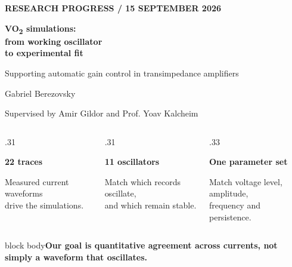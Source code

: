 \documentclass[aspectratio=169,11pt]{beamer}
\newcommand{\eyebrow}[1]{{\color{teal}\scriptsize\bfseries\MakeUppercase{#1}}\par\vspace{2mm}}
\newcommand{\takeaway}[1]{\par\vspace{2mm}\begin{beamercolorbox}[sep=2mm,wd=\linewidth]{block body}\small\bfseries #1\end{beamercolorbox}}
\newcommand{\key}[2]{\par{\color{teal}\Large\bfseries #1}\par\small #2\par}
\begin{document}
\begin{frame}[t]
\eyebrow{Research progress / 15 September 2026}
{\fontsize{27}{32}\selectfont\bfseries VO\textsubscript{2} simulations:\\
from working oscillator\\to experimental fit\par}
\vspace{3mm}
{\color{muted}\normalsize Supporting automatic gain control in transimpedance amplifiers\par}
\vspace{4mm}
{\normalsize Gabriel Berezovsky\par}
{\small Supervised by Amir Gildor and Prof. Yoav Kalcheim\par}
\vspace{4mm}
\begin{columns}[T,onlytextwidth]
\begin{column}{.31\textwidth}\key{22 traces}{Measured current waveforms\\drive the simulations.}\end{column}
\begin{column}{.31\textwidth}\key{11 oscillators}{Match which records oscillate,\\and which remain stable.}\end{column}
\begin{column}{.33\textwidth}\key{One parameter set}{Match voltage level, amplitude,\\frequency and persistence.}\end{column}
\end{columns}
\takeaway{Our goal is quantitative agreement across currents, not simply a waveform that oscillates.}
\end{frame}
\end{document}
